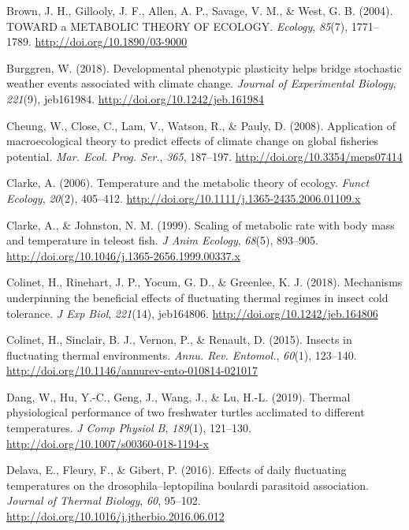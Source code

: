\documentclass[12pt,twoside]{reedthesis}
\begin{document}
\leavevmode\hypertarget{ref-brown_toward_2004}{}%
Brown, J. H., Gillooly, J. F., Allen, A. P., Savage, V. M., \& West, G. B. (2004). TOWARD a METABOLIC THEORY OF ECOLOGY. \emph{Ecology}, \emph{85}(7), 1771--1789. \url{http://doi.org/10.1890/03-9000}

\leavevmode\hypertarget{ref-burggren_developmental_2018}{}%
Burggren, W. (2018). Developmental phenotypic plasticity helps bridge stochastic weather events associated with climate change. \emph{Journal of Experimental Biology}, \emph{221}(9), jeb161984. \url{http://doi.org/10.1242/jeb.161984}

\leavevmode\hypertarget{ref-cheung_application_2008}{}%
Cheung, W., Close, C., Lam, V., Watson, R., \& Pauly, D. (2008). Application of macroecological theory to predict effects of climate change on global fisheries potential. \emph{Mar. Ecol. Prog. Ser.}, \emph{365}, 187--197. \url{http://doi.org/10.3354/meps07414}

\leavevmode\hypertarget{ref-clarke_temperature_2006}{}%
Clarke, A. (2006). Temperature and the metabolic theory of ecology. \emph{Funct Ecology}, \emph{20}(2), 405--412. \url{http://doi.org/10.1111/j.1365-2435.2006.01109.x}

\leavevmode\hypertarget{ref-clarke_scaling_1999}{}%
Clarke, A., \& Johnston, N. M. (1999). Scaling of metabolic rate with body mass and temperature in teleost fish. \emph{J Anim Ecology}, \emph{68}(5), 893--905. \url{http://doi.org/10.1046/j.1365-2656.1999.00337.x}

\leavevmode\hypertarget{ref-colinet_mechanisms_2018}{}%
Colinet, H., Rinehart, J. P., Yocum, G. D., \& Greenlee, K. J. (2018). Mechanisms underpinning the beneficial effects of fluctuating thermal regimes in insect cold tolerance. \emph{J Exp Biol}, \emph{221}(14), jeb164806. \url{http://doi.org/10.1242/jeb.164806}

\leavevmode\hypertarget{ref-colinet_insects_2015}{}%
Colinet, H., Sinclair, B. J., Vernon, P., \& Renault, D. (2015). Insects in fluctuating thermal environments. \emph{Annu. Rev. Entomol.}, \emph{60}(1), 123--140. \url{http://doi.org/10.1146/annurev-ento-010814-021017}

\leavevmode\hypertarget{ref-dang_thermal_2019}{}%
Dang, W., Hu, Y.-C., Geng, J., Wang, J., \& Lu, H.-L. (2019). Thermal physiological performance of two freshwater turtles acclimated to different temperatures. \emph{J Comp Physiol B}, \emph{189}(1), 121--130. \url{http://doi.org/10.1007/s00360-018-1194-x}

\leavevmode\hypertarget{ref-delava_effects_2016}{}%
Delava, E., Fleury, F., \& Gibert, P. (2016). Effects of daily fluctuating temperatures on the drosophila--leptopilina boulardi parasitoid association. \emph{Journal of Thermal Biology}, \emph{60}, 95--102. \url{http://doi.org/10.1016/j.jtherbio.2016.06.012}
\end{document}
